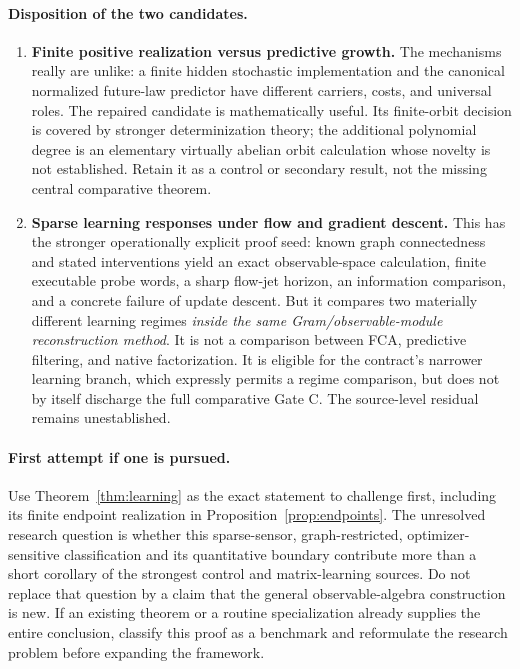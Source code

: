 \documentclass[11pt]{article}
\theoremstyle{remark}
\begin{document}
\paragraph{Disposition of the two candidates.}
\begin{enumerate}
\item \textbf{Finite positive realization versus predictive growth.} The mechanisms really are unlike: a finite hidden stochastic implementation and the canonical normalized future-law predictor have different carriers, costs, and universal roles. The repaired candidate is mathematically useful. Its finite-orbit decision is covered by stronger determinization theory; the additional polynomial degree is an elementary virtually abelian orbit calculation whose novelty is not established. Retain it as a control or secondary result, not the missing central comparative theorem.
\item \textbf{Sparse learning responses under flow and gradient descent.} This has the stronger operationally explicit proof seed: known graph connectedness and stated interventions yield an exact observable-space calculation, finite executable probe words, a sharp flow-jet horizon, an information comparison, and a concrete failure of update descent. But it compares two materially different learning regimes \emph{inside the same Gram/observable-module reconstruction method}. It is not a comparison between FCA, predictive filtering, and native factorization. It is eligible for the contract's narrower learning branch, which expressly permits a regime comparison, but does not by itself discharge the full comparative Gate C. The source-level residual remains unestablished.
\end{enumerate}

\paragraph{First attempt if one is pursued.}
Use Theorem~\ref{thm:learning} as the exact statement to challenge first, including its finite endpoint realization in Proposition~\ref{prop:endpoints}. The unresolved research question is whether this sparse-sensor, graph-restricted, optimizer-sensitive classification and its quantitative boundary contribute more than a short corollary of the strongest control and matrix-learning sources. Do not replace that question by a claim that the general observable-algebra construction is new. If an existing theorem or a routine specialization already supplies the entire conclusion, classify this proof as a benchmark and reformulate the research problem before expanding the framework.
\end{document}
